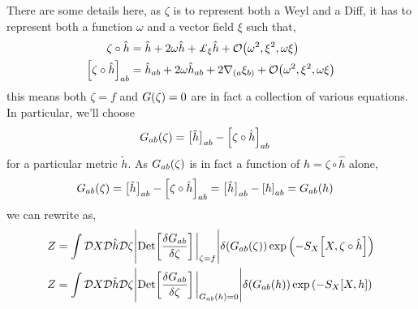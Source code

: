 There are some details here, as $\zeta$ is to represent both a Weyl and a Diff, it has to represent both a function $\omega$ and a vector field $\xi$ such 
that,
\begin{align*}
    \zeta \circ \hat h&=\hat h+2\omega \hat h+\pounds_\xi \hat h+\mathcal O\qty(\omega^2,\xi^2,\omega\xi)\\
    \qty[\zeta \circ\hat  h]_{ab}&=\hat h_{ab}+2\omega \hat h_{ab}+2\nabla_{(a}\xi_{b)}+\mathcal O\qty(\omega^2,\xi^2,\omega\xi)
\end{align*}
this means both $\zeta=f$ and $G\qty(\zeta)=0$ are in fact a collection of various equations. In particular, we'll choose
\begin{align*}
    G_{ab}\qty(\zeta)&=\qty[\tilde h]_{ab}-\qty[\zeta\circ \hat h]_{ab}
\end{align*}
for a particular metric $\tilde h$. As $G_{ab}\qty(\zeta)$ is in fact a function of $h=\zeta\circ \hat h$ alone,
\begin{align*}
    G_{ab}\qty(\zeta)&=\qty[\tilde h]_{ab}-\qty[\zeta\circ \hat h]_{ab}=\qty[\tilde h]_{ab}-\qty[h]_{ab}=G_{ab}\qty(h)
\end{align*}
we can rewrite as,
\begin{align*}
    Z&=\int\Dd{X}\Dd{\hat h}\Dd{\zeta}\abs{\Det\qty[\fdv{G_{ab}}{\zeta}]\eval_{\zeta=f}}\delta\qty(G_{ab}\qty(\zeta))\exp\qty(-S_X\qty[X,\zeta\circ \hat h])\\
    Z&=\int\Dd{X}\Dd{\hat h}\Dd{\zeta}\abs{\Det\qty[\fdv{G_{ab}}{\zeta}]\eval_{G_{ab}\qty(h)=0}}\delta\qty(G_{ab}\qty(h))\exp\qty(-S_X\qty[X,h])
\end{align*}

